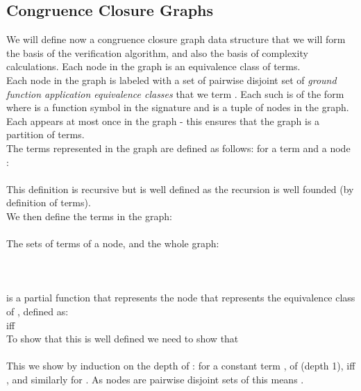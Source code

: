 \subsection{Congruence Closure Graphs}
We will define now a congruence closure graph data structure that we will form the basis of the verification algorithm, 
and also the basis of complexity calculations. Each node in the graph is an equivalence class of terms.\\
Each node in the graph is labeled with a set of pairwise disjoint set of \emph{ground function application equivalence classes} that we term \GFAEC. Each such \GFAEC is of the form  where  is a function symbol in the signature and  is a tuple of nodes in the graph. Each \GFAEC appears at most once in the graph - this ensures that the graph is a partition of terms.\\
The terms represented in the graph are defined as follows: for a term  and a node :\\
\\
This definition is recursive but is well defined as the recursion is well founded (by definition of terms).\\
We then define the terms in the graph:\\
\\
The sets of terms of a node, and the whole graph:\\
\\
\\
\\
 is a partial function that represents the node that represents the equivalence class of , defined as:\\
 iff \\
To show that this is well defined we need to show that \\
\\
This we show by induction on the depth of : for a constant term , of (depth 1), 
 iff , and similarly for . As nodes are pairwise disjoint sets of \GFAECs{} this means .\\
